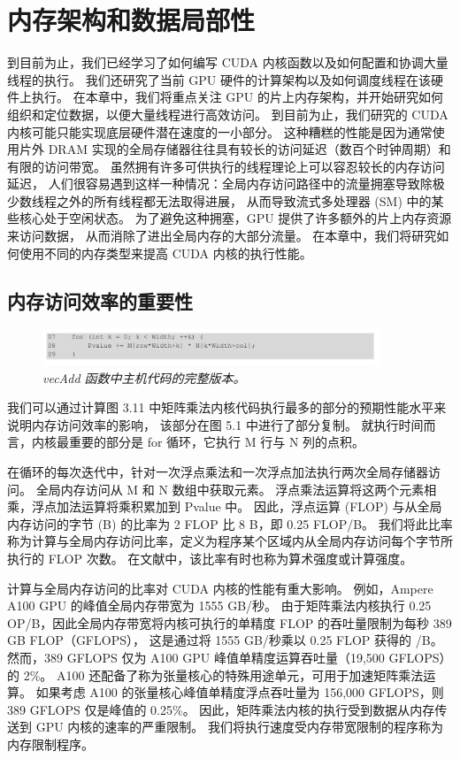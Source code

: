 \section{内存架构和数据局部性}
到目前为止，我们已经学习了如何编写 CUDA 内核函数以及如何配置和协调大量线程的执行。 
我们还研究了当前 GPU 硬件的计算架构以及如何调度线程在该硬件上执行。 
在本章中，我们将重点关注 GPU 的片上内存架构，并开始研究如何组织和定位数据，以便大量线程进行高效访问。 
到目前为止，我们研究的 CUDA 内核可能只能实现底层硬件潜在速度的一小部分。 
这种糟糕的性能是因为通常使用片外 DRAM 实现的全局存储器往往具有较长的访问延迟（数百个时钟周期）和有限的访问带宽。 
虽然拥有许多可供执行的线程理论上可以容忍较长的内存访问延迟，
人们很容易遇到这样一种情况：全局内存访问路径中的流量拥塞导致除极少数线程之外的所有线程都无法取得进展，
从而导致流式多处理器 (SM) 中的某些核心处于空闲状态。 为了避免这种拥塞，GPU 提供了许多额外的片上内存资源来访问数据，
从而消除了进出全局内存的大部分流量。 在本章中，我们将研究如何使用不同的内存类型来提高 CUDA 内核的执行性能。

\subsection{内存访问效率的重要性}
\begin{figure}[H]
	\centering
	\includegraphics[width=0.9\textwidth]{figs/F5.1.png}
	\caption{\textit{\color{red} vecAdd 函数中主机代码的完整版本。}}
\end{figure}

我们可以通过计算图 3.11 中矩阵乘法内核代码执行最多的部分的预期性能水平来说明内存访问效率的影响，
该部分在图 5.1 中进行了部分复制。 就执行时间而言，内核最重要的部分是 for 循环，它执行 M 行与 N 列的点积。

在循环的每次迭代中，针对一次浮点乘法和一次浮点加法执行两次全局存储器访问。 全局内存访问从 M 和 N 数组中获取元素。 
浮点乘法运算将这两个元素相乘，浮点加法运算将乘积累加到 Pvalue 中。 
因此，浮点运算 (FLOP) 与从全局内存访问的字节 (B) 的比率为 2 FLOP 比 8 B，即 0.25 FLOP/B。 
我们将此比率称为计算与全局内存访问比率，定义为程序某个区域内从全局内存访问每个字节所执行的 FLOP 次数。 
在文献中，该比率有时也称为算术强度或计算强度。

计算与全局内存访问的比率对 CUDA 内核的性能有重大影响。 例如，Ampere A100 GPU 的峰值全局内存带宽为 1555 GB/秒。 
由于矩阵乘法内核执行 0.25 OP/B，因此全局内存带宽将内核可执行的单精度 FLOP 的吞吐量限制为每秒 389 GB FLOP（GFLOPS），
这是通过将 1555 GB/秒乘以 0.25 FLOP 获得的 /B。 
然而，389 GFLOPS 仅为 A100 GPU 峰值单精度运算吞吐量（19,500 GFLOPS）的 2\%。 
A100 还配备了称为张量核心的特殊用途单元，可用于加速矩阵乘法运算。 
如果考虑 A100 的张量核心峰值单精度浮点吞吐量为 156,000 GFLOPS，则 389 GFLOPS 仅是峰值的 0.25\%。 
因此，矩阵乘法内核的执行受到数据从内存传送到 GPU 内核的速率的严重限制。 
我们将执行速度受内存带宽限制的程序称为内存限制程序。

